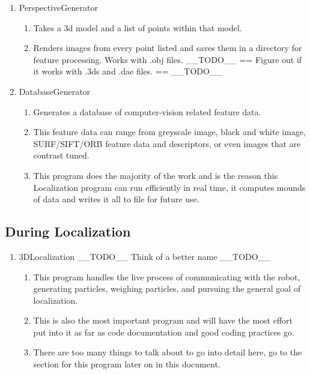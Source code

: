 \documentclass[a4paper,11pt]{article}
\begin{document}
        \begin{enumerate}
        \item PerspectiveGenerator
            \begin{enumerate}
            \item Takes a 3d model and a list of points within that model.
            \item Renders images from every point listed and saves them in a directory for feature processing. Works with .obj files. __TODO__ == Figure out if it works with .3ds and .dae files. == __TODO__
            \end{enumerate}
        \item DatabaseGenerator
            \begin{enumerate}
            \item Generates a database of computer-vision related feature data.
            \item This feature data can range from greyscale image, black and white image, SURF/SIFT/ORB feature data and descriptors, or even images that are contrast tuned.
            \item This program does the majority of the work and is the reason this Localization program can run efficiently in real time, it computes mounds of data and writes it all to file for future use.
            \end{enumerate}
        \end{enumerate}
  
        \subsection{During Localization}
        \begin{enumerate}
        \item 3DLocalization __TODO__ Think of a better name __TODO__
            \begin{enumerate}
            \item This program handles the live process of communicating with the robot, generating particles, weighing particles, and pursuing the general goal of localization.
            \item This is also the most important program and will have the most effort put into it as far as code documentation and good coding practices go.
            \item There are too many things to talk about to go into detail here, go to the section for this program later on in this document.
            \end{enumerate}
        \end{enumerate}
\end{document}
